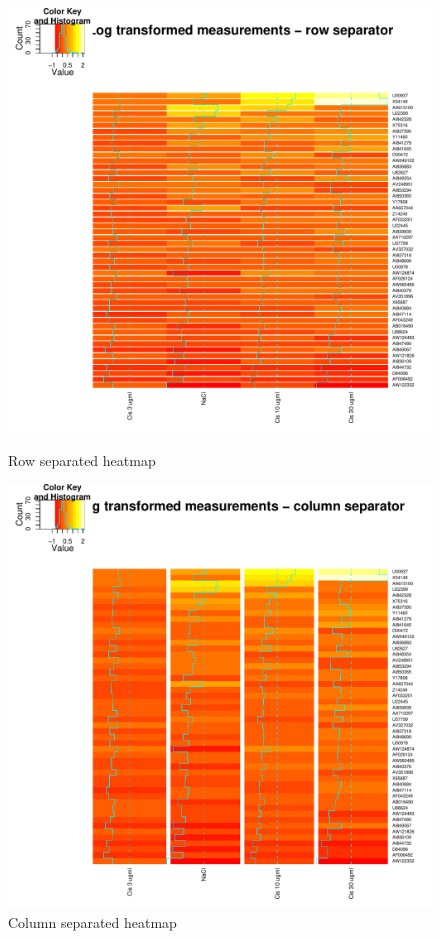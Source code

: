 \documentclass[12pt, oneside, letterpaper]{article}
\begin{document}
\begin{figure}[p]
\begin{minipage}[t]{2.5in}
\centering
\includegraphics[width=\textwidth]{rowSeparator}
\caption{Row separated heatmap}
\label{Row separated heatmap}
\end{minipage}
\hfill
\begin{minipage}[t]{2.5in}
\centering
\includegraphics[width=\textwidth]{colSeparator}
\caption{Column separated heatmap}
\label{Column separated heatmap}
\end{minipage}
\end{figure}
\end{document}
